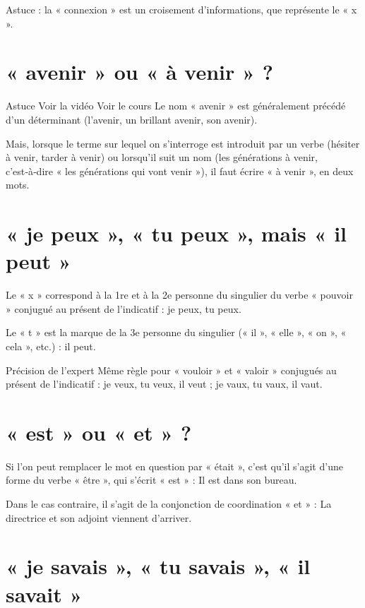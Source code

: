 Astuce : la « connexion » est un croisement d'informations, que représente le « x ».



\section{« avenir » ou « à venir » ?}

Astuce Voir la vidéo Voir le cours
Le nom « avenir » est généralement précédé d'un déterminant (l'avenir, un brillant avenir, son avenir).

Mais, lorsque le terme sur lequel on s'interroge est introduit par un verbe (hésiter à venir, tarder à venir) ou lorsqu'il suit un nom (les générations à venir, c'est‑à‑dire « les générations qui vont venir »), il faut écrire « à venir », en deux mots.

\section{« je peux », « tu peux », mais « il peut »}

Le « x » correspond à la 1re et à la 2e personne du singulier du verbe « pouvoir » conjugué au présent de l'indicatif : je peux, tu peux.

Le « t » est la marque de la 3e personne du singulier (« il », « elle », « on », « cela », etc.) : il peut.

Précision de l'expert
Même règle pour « vouloir » et « valoir » conjugués au présent de l'indicatif : je veux, tu veux, il veut ; je vaux, tu vaux, il vaut.



\section{« est » ou « et » ?}

Si l'on peut remplacer le mot en question par « était », c'est qu'il s'agit d'une forme du verbe « être », qui s'écrit « est » : Il est dans son bureau.

Dans le cas contraire, il s'agit de la conjonction de coordination « et » : La directrice et son adjoint viennent d'arriver.





\section{« je savais », « tu savais », « il savait »}

